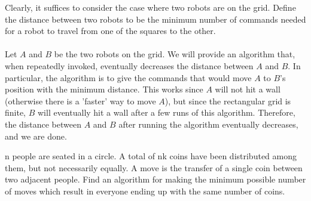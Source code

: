 \sol Clearly, it suffices to consider the case where two robots are on the grid. Define the distance between two robots to be the minimum number of commands needed for a robot to travel from one of the squares to the other.
\\\\
Let $A$ and $B$ be the two robots on the grid. We will provide an algorithm that, when repeatedly invoked, eventually decreases the distance between $A$ and $B$. In particular, the algorithm is to give the commands that would move $A$ to $B$'s position with the minimum distance. This works since $A$ will not hit a wall (otherwise there is a 'faster' way to move $A$), but since the rectangular grid is finite, $B$ will eventually hit a wall after a few runs of this algorithm. Therefore, the distance between $A$ and $B$ after running the algorithm eventually decreases, and we are done.

\begin{example} [APMO 1997]
    n people are seated in a circle. A total of nk coins have been distributed among them, but not necessarily equally. A move is the transfer of a single coin between two adjacent people. Find an algorithm for making the minimum possible number of moves which result in everyone ending up with the same number of coins. 
\end{example}

